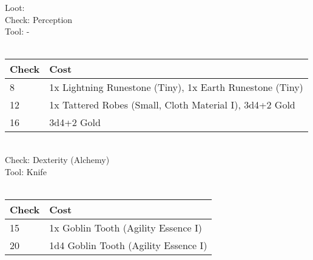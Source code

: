 Loot:\\
Check: Perception\\
Tool: -\\
\\
\begin{minipage}{0.8\textwidth}
	\begin{tabular}{|l | l|}
		\hline
		Check & Cost\\
		\hline
		8 & 1x Lightning Runestone (Tiny), 1x Earth Runestone (Tiny)\\
		12 & 1x Tattered Robes (Small, Cloth Material I), 3d4+2 Gold\\
		16 & 3d4+2 Gold\\
		\hline
	\end{tabular}
\end{minipage}
\\
Check: Dexterity (Alchemy)\\
Tool: Knife\\
\\
\begin{minipage}{0.8\textwidth}
	\begin{tabular}{|l | l|}
		\hline
		Check & Cost\\
		\hline
		15 & 1x Goblin Tooth (Agility Essence I)\\
		20 & 1d4 Goblin Tooth (Agility Essence I)\\
		\hline
	\end{tabular}
\end{minipage}
\pagebreak